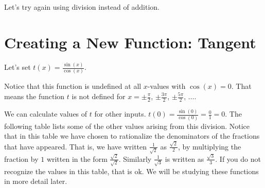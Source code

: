 \documentclass{ximera}
\begin{document}
	Let's try again using division instead of addition.

\section{Creating a New Function: Tangent}	
	Let's set $t(x) = \frac{\sin(x)}{\cos(x)}$.
	
	Notice that this function is undefined at all $x$-values with $\cos(x) = 0$. That means the function $t$ is not defined for $x=\pm \frac{\pi}{2}$, 
	$\pm \frac{3\pi}{2}$, $\pm \frac{5\pi}{2}$, $\ldots$.
	
	We can calculate values of $t$ for other inputs. $t\left( 0\right) = \frac{\sin\left( 0\right)}{\cos\left(0\right)} = \frac{0}{1} = 0$.
	The following table lists some of the other values arising from this division. Notice that in this table we have chosen to rationalize the denominators
	of the fractions that have appeared. That is, we have written $\frac{1}{\sqrt{2}}$ as $\frac{\sqrt{2}}{2}$, by multiplying the fraction by $1$ written in 
	the form $\frac{\sqrt{2}}{\sqrt{2}}$. Similarly $\frac{1}{\sqrt{3}}$ is written as $\frac{\sqrt{3}}{3}$. If you do not recognize the values in this table, 
	that is ok.  We will be studying these functions in more detail later.
\end{document}
